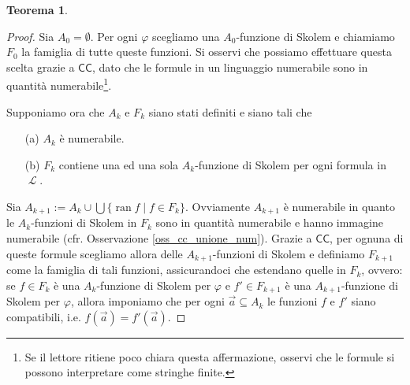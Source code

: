 \documentclass[12pt,a4paper]{report}
\theoremstyle{definition}
\newtheorem{teo}{Teorema}[section]  %
\theoremstyle{num.custom-title}
\DeclareMathOperator{\ran}{ran}
\DeclareMathOperator{\LL}{\mathcal{L}}
\DeclareMathOperator{\sse}{\subseteq}
\newcommand{\CC}{\ensuremath{\mathsf{CC}}\xspace}
\renewcommand{\phi}{\varphi}
\begin{document}
\begin{teo}
\begin{proof}
Sia $A_0= \emptyset$. Per ogni $\phi$ scegliamo una $A_0$-funzione di Skolem e chiamiamo $F_0$ la famiglia di tutte queste funzioni. Si osservi che possiamo effettuare questa scelta grazie a \CC, dato che le formule in un linguaggio numerabile sono in quantità numerabile\footnote{Se il lettore ritiene poco chiara questa affermazione, osservi che le formule si possono interpretare come stringhe finite.}. 

Supponiamo ora che $A_k$ e $F_k$ siano stati definiti e siano tali che
\begin{itemize}
\item[(a)] $A_k$ è numerabile.
\item[(b)] $F_k$ contiene una ed una sola $A_k$-funzione di Skolem per ogni formula in $\LL$.
\end{itemize}
Sia $A_{k+1} := A_k \cup \bigcup \{\ran f \mid f \in F_k\}$. Ovviamente $A_{k+1}$ è numerabile in quanto le $A_k$-funzioni di Skolem in $F_k$ sono in quantità numerabile e hanno immagine numerabile (cfr. Osservazione \ref{oss_cc_unione_num}). Grazie a \CC, per ognuna di queste formule scegliamo allora delle $A_{k+1}$-funzioni di Skolem e definiamo $F_{k+1}$ come la famiglia di tali funzioni, assicurandoci che estendano quelle in $F_k$, ovvero: se $f \in F_k$ è una $A_k$-funzione di Skolem per $\phi$ e $f' \in F_{k+1}$ è una $A_{k+1}$-funzione di Skolem per $\phi$, allora imponiamo che per ogni $\vec a \sse A_k$ le funzioni $f$ e $f'$ siano compatibili, i.e. $f(\vec a)=f'(\vec a)$.


\end{proof}
\end{teo}
\end{document}

